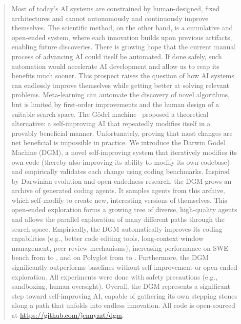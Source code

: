 \begin{abstract}
Most of today's AI systems are constrained by human-designed, fixed architectures and cannot autonomously and continuously improve themselves. The scientific method, on the other hand, is a cumulative and open-ended system, where each innovation builds upon previous artifacts, enabling future discoveries. There is growing hope that the current manual process of advancing AI could itself be automated. If done safely, such automation would accelerate AI development and allow us to reap its benefits much sooner. This prospect raises the question of how AI systems can endlessly improve themselves while getting better at solving relevant problems. Meta-learning can automate the discovery of novel algorithms, but is limited by first-order improvements and the human design of a suitable search space. The G\"odel machine~\citep{schmidhuber2007godel} proposed a theoretical alternative: a self-improving AI that repeatedly modifies itself in a provably beneficial manner. Unfortunately, proving that most changes are net beneficial is impossible in practice. We introduce the Darwin G\"odel Machine (DGM), a novel self-improving system that iteratively modifies its own code (thereby also improving its ability to modify its own codebase) and empirically validates each change using coding benchmarks. Inspired by Darwinian evolution and open-endedness research, the DGM grows an archive of generated coding agents. It samples agents from this archive, which self-modify to create new, interesting versions of themselves. This open-ended exploration forms a growing tree of diverse, high-quality agents and allows the parallel exploration of many different paths through the search space. Empirically, the DGM automatically improves its coding capabilities (e.g., better code editing tools, long-context window management, peer-review mechanisms), increasing performance on SWE-bench from \DgmSweBenchInitial{} to \DgmSweBenchFinal{}, and on Polyglot from \DgmPolyglotInitial{} to \DgmPolyglotFinal{}. Furthermore, the DGM significantly outperforms baselines without self-improvement or open-ended exploration. All experiments were done with safety precautions (e.g., sandboxing, human oversight). Overall, the DGM represents a significant step toward self-improving AI, capable of gathering its own stepping stones along a path that unfolds into endless innovation.
All code is open-sourced at \href{https://github.com/jennyzzt/dgm}{https://github.com/jennyzzt/dgm}.
\end{abstract}

